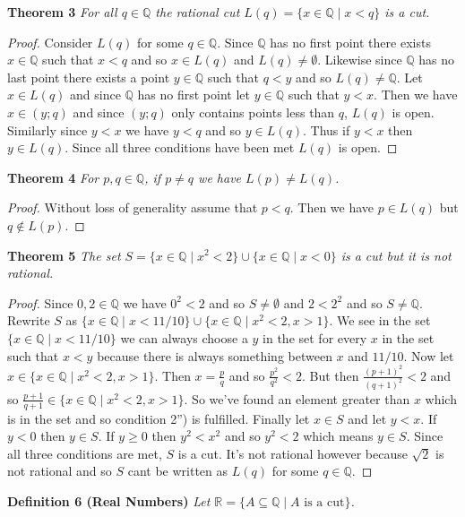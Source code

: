 \documentclass{article}
\begin{document}
\begin{flushleft}
\textbf{Theorem 3}
\textsl{For all $q \in \mathbb{Q}$ the rational cut $L(q) = \{x \in \mathbb{Q} \mid x < q\}$ is a cut.}
\begin{proof}
Consider $L(q)$ for some $q \in \mathbb{Q}$. Since $\mathbb{Q}$ has no first point there exists $x \in \mathbb{Q}$ such that $x<q$ and so $x \in L(q)$ and $L(q) \neq \emptyset$. Likewise since $\mathbb{Q}$ has no last point there exists a point $y \in \mathbb{Q}$ such that $q<y$ and so $L(q) \neq \mathbb{Q}$. Let $x \in L(q)$ and since $\mathbb{Q}$ has no first point let $y \in \mathbb{Q}$ such that $y<x$. Then we have $x \in (y;q)$ and since $(y;q)$ only contains points less than $q$, $L(q)$ is open. Similarly since $y < x$ we have $y<q$ and so $y \in L(q)$. Thus if $y<x$ then $y \in L(q)$. Since all three conditions have been met $L(q)$ is open.
\end{proof}

\textbf{Theorem 4}
\textsl{For $p,q \in \mathbb{Q}$, if $p \neq q$ we have $L(p) \neq L(q)$.}
\begin{proof}
Without loss of generality assume that $p<q$. Then we have $p \in L(q)$ but $q \notin L(p)$.
\end{proof}

\textbf{Theorem 5}
\textsl{The set $S=\{x \in \mathbb{Q} \mid x^2 < 2\} \cup \{x \in \mathbb{Q} \mid x < 0\}$ is a cut but it is not rational.}
\begin{proof}
Since $0,2 \in \mathbb{Q}$ we have $0^2<2$ and so $S \neq \emptyset$ and $2<2^2$ and so $S \neq \mathbb{Q}$. Rewrite $S$ as $\{x \in \mathbb{Q} \mid x<11/10\} \cup \{x \in \mathbb{Q} \mid x^2<2, x>1\}$. We see in the set $\{x \in \mathbb{Q} \mid x<11/10\}$ we can always choose a $y$ in the set for every $x$ in the set such that $x<y$ because there is always something between $x$ and $11/10$. Now let $x \in \{x \in \mathbb{Q} \mid x^2<2, x>1\}$. Then $x=\frac{p}{q}$ and so $\frac{p^2}{q^2}<2$. But then $\frac{(p+1)^2}{(q+1)^2}<2$ and so $\frac{p+1}{q+1} \in \{x \in \mathbb{Q} \mid x^2<2, x>1\}$. So we've found an element greater than $x$ which is in the set and so condition 2'') is fulfilled. Finally let $x \in S$ and let $y<x$. If $y<0$ then $y \in S$. If $y \geq 0$ then $y^2<x^2$ and so $y^2<2$ which means $y \in S$. Since all three conditions are met, $S$ is a cut. It's not rational however because $\sqrt{2}$ is not rational and so $S$ cant be written as $L(q)$ for some $q \in \mathbb{Q}$.
\end{proof}

\textbf{Definition 6 (Real Numbers)}
\textsl{Let $\mathbb{R} = \{A \subseteq \mathbb{Q} \mid A \text{ is a cut}\}$.}
\newline


\end{flushleft}
\end{document}
